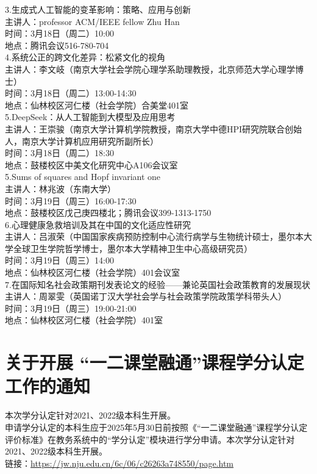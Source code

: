 \documentclass[letterpaper, 12pt]{article}
\begin{document}
\begin{multicols}{2}
3.生成式人工智能的变革影响：策略、应用与创新\\
主讲人：professor ACM/IEEE fellow Zhu Han\\
时间：3月18日（周二）10:00\\
地点：腾讯会议516-780-704\\

4.系统公正的跨文化差异：松紧文化的视角\\
主讲人：李文岐（南京大学社会学院心理学系助理教授，北京师范大学心理学博士）\\
时间：3月18日（周二）13:00-14:30\\
地点：仙林校区河仁楼（社会学院）合美堂401室\\

5.DeepSeek：从人工智能到大模型及应用思考\\
主讲人：王崇骏（南京大学计算机学院教授，南京大学中德HPI研究院联合创始人，南京大学计算机应用研究所副所长）\\
时间：3月18日（周二）18:30\\
地点：鼓楼校区中美文化研究中心A106会议室\\

5.Sums of squares and Hopf invariant one\\
主讲人：林兆波（东南大学）\\
时间：3月19日（周三）16:00-17:30\\
地点：鼓楼校区戊己庚四楼北；腾讯会议399-1313-1750\\

6.心理健康急救培训及其在中国的文化适应性研究\\
主讲人：吕淑荣（中国国家疾病预防控制中心流行病学与生物统计硕士，墨尔本大学全球卫生学院哲学博士，墨尔本大学精神卫生中心高级研究员）\\
时间：3月19日（周三）14:00\\
地点：仙林校区河仁楼（社会学院）401会议室\\

7.在国际知名社会政策期刊发表论文的经验——兼论英国社会政策教育的发展现状\\
主讲人：周翠雯（英国诺丁汉大学社会学与社会政策学院政策学科带头人）\\
时间：3月19日（周三）19:00-21:00\\
地点：仙林校区河仁楼（社会学院）401室\\

\section{关于开展 “一二课堂融通”课程学分认定工作的通知}
本次学分认定针对2021、2022级本科生开展。\\
申请学分认定的本科生应于2025年5月30日前按照《“一二课堂融通”课程学分认定评价标准》在教务系统中的“学分认定”模块进行学分申请。本次学分认定针对2021、2022级本科生开展。\\
链接：\url{https://jw.nju.edu.cn/6c/06/c26263a748550/page.htm}\\

\end{multicols}
\end{document}
